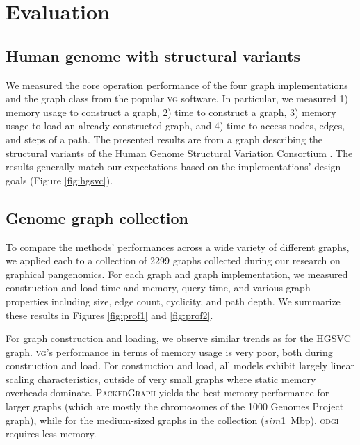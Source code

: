 \documentclass{article}
\begin{document}

\section{Evaluation}

\subsection{Human genome with structural variants}

We measured the core operation performance of the four graph implementations and the graph class from the popular \textsc{vg} software.
In particular, we measured 1) memory usage to construct a graph, 2) time to construct a graph, 3) memory usage to load an already-constructed graph, and 4) time to access nodes, edges, and steps of a path.
The presented results are from a graph describing the structural variants of the Human Genome Structural Variation Consortium \cite{chaisson2019multi}.
The results generally match our expectations based on the implementations' design goals (Figure \ref{fig:hgsvc}).

\subsection{Genome graph collection}

To compare the methods' performances across a wide variety of different graphs, we applied each to a collection of 2299 graphs collected during our research on graphical pangenomics.
For each graph and graph implementation, we measured construction and load time and memory, query time, and various graph properties including size, edge count, cyclicity, and path depth.
We summarize these results in Figures \ref{fig:prof1} and \ref{fig:prof2}.

For graph construction and loading, we observe similar trends as for the HGSVC graph.
\textsc{vg}'s performance in terms of memory usage is very poor, both during construction and load.
For construction and load, all models exhibit largely linear scaling characteristics, outside of very small graphs where static memory overheads dominate.
\textsc{PackedGraph} yields the best memory performance for larger graphs (which are mostly the chromosomes of the 1000 Genomes Project graph), while for the medium-sized graphs in the collection ($sim$1~Mbp), \textsc{odgi} requires less memory.
\end{document}
